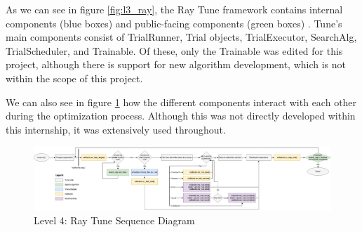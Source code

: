 As we can see in figure \ref{fig:l3_ray}, the Ray Tune framework contains internal components (blue boxes) and public-facing components (green boxes) \parencite{ray}. Tune’s main components consist of TrialRunner, Trial objects, TrialExecutor, SearchAlg, TrialScheduler, and Trainable. Of these, only the Trainable was edited for this project, although there is support for new algorithm development, which is not within the scope of this project.

We can also see in figure \ref{fig:l3_ray_seq} how the different components interact with each other during the optimization process. Although this was not directly developed within this internship, it was extensively used throughout.


\begin{figure}
\centering
\includegraphics[width=\textwidth, keepaspectratio]{images/tune_component_flwo.png}
\caption{Level 4: Ray Tune Sequence Diagram \parencite{ray}}
\label{fig:l3_ray_seq}
\end{figure}